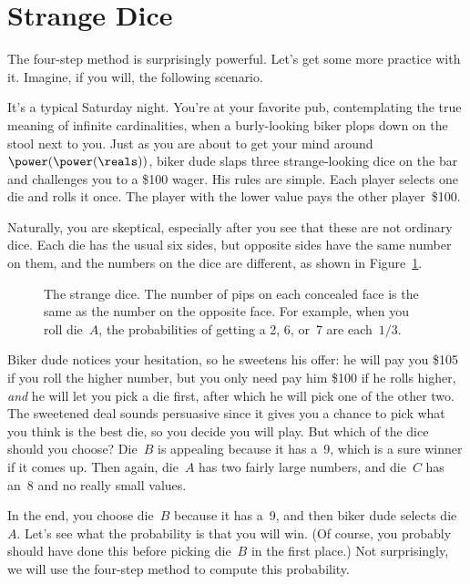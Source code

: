 \section{Strange Dice}\label{sec:strange-dice}

The four-step method is surprisingly powerful.  Let's get some more
practice with it.  Imagine, if you will, the following scenario.

It's a typical Saturday night.  You're at your favorite pub,
contemplating the true meaning of infinite cardinalities, when a
burly-looking biker plops down on the stool next to you.  Just as you
are about to get your mind around~$\power(\power(\reals))$, biker dude
slaps three strange-looking dice on the bar and challenges you to a
\$100 wager.  His rules are simple.  Each player selects one die and
rolls it once.  The player with the lower value pays the other
player~\$100.

Naturally, you are skeptical, especially after you see that these are
not ordinary dice.  Each die has the usual six sides, but opposite
sides have the same number on them, and the numbers on the dice are
different, as shown in Figure~\ref{fig:14A7}.

\begin{figure}


\caption{The strange dice.  The number of pips on
  each concealed face is the same as the number on the opposite face.
  For example, when you roll die~$A$, the probabilities of getting a
  2, 6, or~7 are each~$1/3$.}

\label{fig:14A7}

\end{figure}

Biker dude notices your hesitation, so he sweetens his offer: he will
pay you \$105 if you roll the higher number, but you only need pay him
\$100 if he rolls higher, \emph{and} he will let you pick a die first,
after which he will pick one of the other two.  The sweetened deal
sounds persuasive since it gives you a chance to pick what you think
is the best die, so you decide you will play.  But which of the dice
should you choose?  Die~$B$ is appealing because it has a~9, which is
a sure winner if it comes up.  Then again, die~$A$ has two fairly
large numbers, and die~$C$ has an~8 and no really small values.

In the end, you choose die~$B$ because it has a~9, and then biker dude
selects die~$A$.  Let's see what the probability is that you will win.
(Of course, you probably should have done this before picking die~$B$
in the first place.)  Not surprisingly, we will use the four-step
method to compute this probability.

